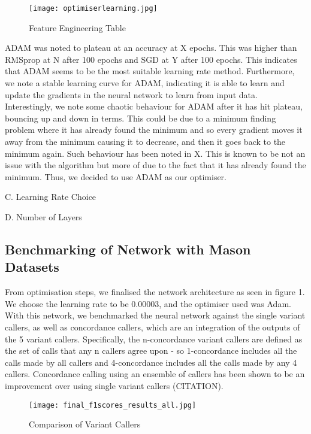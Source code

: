 \documentclass{article}
\begin{document}
\begin{figure}[H]
\caption{Feature Engineering Table}
\texttt{[image: optimiserlearning.jpg]}
\centering
\end{figure}

ADAM was noted to plateau at an accuracy at X epochs. This was higher than RMSprop at N after 100 epochs and SGD at Y after 100 epochs. This indicates that ADAM seems to be the most suitable learning rate method. Furthermore, we note a stable learning curve for ADAM, indicating it is able to learn and update the gradients in the neural network to learn from input data. Interestingly, we note some chaotic behaviour for ADAM after it has hit plateau, bouncing up and down in terms. This could be due to a minimum finding problem where it has already found the minimum and so every gradient moves it away from the minimum causing it to decrease, and then it goes back to the minimum again. Such behaviour has been noted in X. This is known to be not an issue with the algorithm but more of due to the fact that it has already found the minimum. Thus, we decided to use ADAM as our optimiser. 




C. Learning Rate Choice



D. Number of Layers 



\subsection{Benchmarking of Network with Mason Datasets}
From optimisation steps, we finalised the network architecture as seen in figure 1. We choose the learning rate to be 0.00003, and the optimiser used was Adam. With this network, we benchmarked the neural network against the single variant callers, as well as concordance callers, which are an integration of the outputs of the 5 variant callers. Specifically, the n-concordance variant callers are defined as the set of calls that any n callers agree upon - so 1-concordance includes all the calls made by all callers and 4-concordance includes all the calls made by any 4 callers. Concordance calling using an ensemble of callers has been shown to be an improvement over using single variant callers (CITATION). 

\begin{figure}[H]
\texttt{[image: final\_f1scores\_results\_all.jpg]}
\caption{Comparison of Variant Callers}
\centering
\end{figure}
\end{document}
